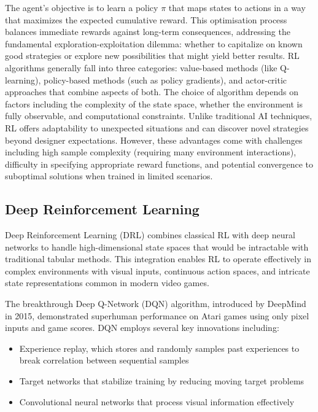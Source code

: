 The agent's objective is to learn a policy $\pi$ that maps states to actions in a way that maximizes the expected cumulative reward. 
This optimisation process balances immediate rewards against long-term consequences, addressing the fundamental exploration-exploitation dilemma: whether to capitalize on known good strategies or explore new possibilities that might yield better results.
RL algorithms generally fall into three categories: value-based methods (like Q-learning), policy-based methods (such as policy gradients), and actor-critic approaches that combine aspects of both. 
The choice of algorithm depends on factors including the complexity of the state space, whether the environment is fully observable, and computational constraints.
Unlike traditional AI techniques, RL offers adaptability to unexpected situations and can discover novel strategies beyond designer expectations. 
However, these advantages come with challenges including high sample complexity (requiring many environment interactions), difficulty in specifying appropriate reward functions, and potential convergence to suboptimal solutions when trained in limited scenarios.

\subsection{Deep Reinforcement Learning}

Deep Reinforcement Learning (DRL) combines classical RL with deep neural networks to handle high-dimensional state spaces that would be intractable with traditional tabular methods. 
This integration enables RL to operate effectively in complex environments with visual inputs, continuous action spaces, and intricate state representations common in modern video games.

The breakthrough Deep Q-Network (DQN) algorithm, introduced by DeepMind in 2015, demonstrated superhuman performance on Atari games using only pixel inputs and game scores. DQN employs several key innovations including:
\begin{itemize}
    \item Experience replay, which stores and randomly samples past experiences to break correlation between sequential samples
    \item Target networks that stabilize training by reducing moving target problems
    \item Convolutional neural networks that process visual information effectively
\end{itemize}
